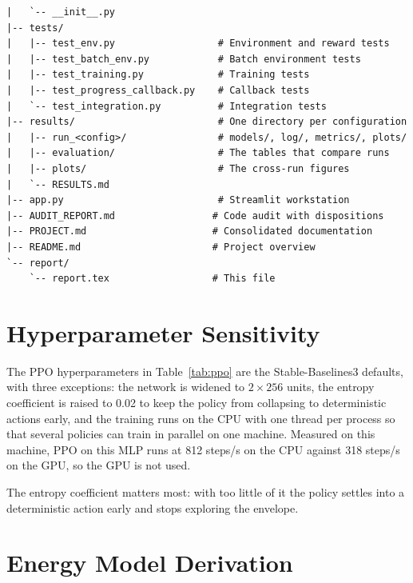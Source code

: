 \documentclass[11pt,a4paper]{article}
\begin{document}
\begin{lstlisting}[style=bash, caption=Project directory tree]
|   `-- __init__.py
|-- tests/
|   |-- test_env.py                  # Environment and reward tests
|   |-- test_batch_env.py            # Batch environment tests
|   |-- test_training.py             # Training tests
|   |-- test_progress_callback.py    # Callback tests
|   `-- test_integration.py          # Integration tests
|-- results/                         # One directory per configuration
|   |-- run_<config>/                # models/, log/, metrics/, plots/
|   |-- evaluation/                  # The tables that compare runs
|   |-- plots/                       # The cross-run figures
|   `-- RESULTS.md
|-- app.py                           # Streamlit workstation
|-- AUDIT_REPORT.md                 # Code audit with dispositions
|-- PROJECT.md                      # Consolidated documentation
|-- README.md                       # Project overview
`-- report/
    `-- report.tex                  # This file
\end{lstlisting}

\section{Hyperparameter Sensitivity}
\label{app:sensitivity}

The PPO hyperparameters in Table~\ref{tab:ppo} are the Stable-Baselines3 defaults, with three exceptions: the network is widened to $2\times256$ units, the entropy coefficient is raised to 0.02 to keep the policy from collapsing to deterministic actions early, and the training runs on the CPU with one thread per process so that several policies can train in parallel on one machine. Measured on this machine, PPO on this MLP runs at 812 steps/s on the CPU against 318 steps/s on the GPU, so the GPU is not used.

The entropy coefficient matters most: with too little of it the policy settles into a deterministic action early and stops exploring the envelope.

\section{Energy Model Derivation}
\label{app:energy}
\end{document}
